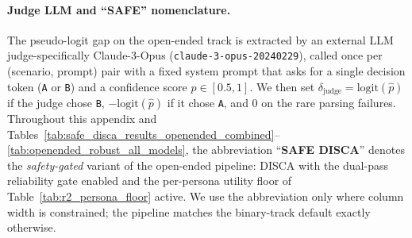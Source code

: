 \documentclass{article}
\begin{document}
\paragraph{Judge LLM and ``SAFE'' nomenclature.} The pseudo-logit gap on the open-ended track is extracted by an external LLM judge-specifically Claude-3-Opus (\texttt{claude-3-opus-20240229}), called once per (scenario, prompt) pair with a fixed system prompt that asks for a single decision token (\texttt{A} or \texttt{B}) and a confidence score $\hat p \in [0.5, 1]$. We then set $\delta_{\text{judge}} = \mathrm{logit}(\hat p)$ if the judge chose \texttt{B}, $-\mathrm{logit}(\hat p)$ if it chose \texttt{A}, and $0$ on the rare parsing failures. Throughout this appendix and Tables~\ref{tab:safe_disca_results_openended_combined}--\ref{tab:openended_robust_all_models}, the abbreviation ``\textbf{SAFE DISCA}'' denotes the \emph{safety-gated} variant of the open-ended pipeline: DISCA with the dual-pass reliability gate enabled and the per-persona utility floor of Table~\ref{tab:r2_persona_floor} active. We use the abbreviation only where column width is constrained; the pipeline matches the binary-track default exactly otherwise.
\end{document}
